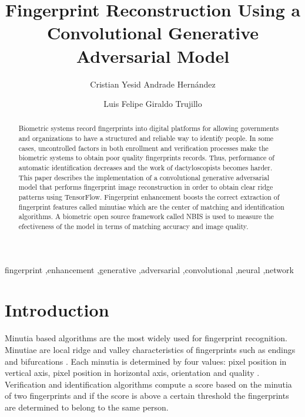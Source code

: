 \documentclass[a4paper,fleqn]{cas-dc}
\begin{document}
\let\WriteBookmarks\relax
\def\floatpagepagefraction{1}
\def\textpagefraction{.001}

\title [mode = title]{Fingerprint Reconstruction Using a Convolutional Generative Adversarial Model}                     

\author{Cristian Yesid Andrade Hernández}

\author{Luis Felipe Giraldo Trujillo}

\begin{abstract}
Biometric systems record fingerprints into digital platforms for allowing governments and organizations to have a structured and reliable way to identify people. In some cases, uncontrolled factors in both enrollment and verification processes make the biometric systems to obtain poor quality fingerprints records. Thus, performance of automatic identification decreases and the work of dactyloscopists becomes harder. This paper describes the implementation of a convolutional generative adversarial model that performs fingerprint image reconstruction in order to obtain clear ridge patterns using TensorFlow. Fingerprint enhancement boosts the correct extraction of fingerprint features called minutiae which are the center of matching and identification algorithms. A biometric open source framework called NBIS is used to measure the efectiveness of the model in terms of matching accuracy and image quality.
\end{abstract}

\begin{keywords}
fingerprint \sep enhancement \sep generative \sep adversarial \sep convolutional \sep neural \sep network
\end{keywords}

\maketitle

\section{Introduction}

Minutia based algorithms are the most widely used for fingerprint recognition. Minutiae are local ridge and valley characteristics of fingerprints such as endings and bifurcations \cite{HFPR}. Each minutia is determined by four values: pixel position in vertical axis, pixel position in horizontal axis, orientation and quality \cite{NBISUG}. Verification and identification algorithms compute a score based on the minutia of two fingerprints and if the score is above a certain threshold the fingerprints are determined to belong to the same person.
\end{document}
